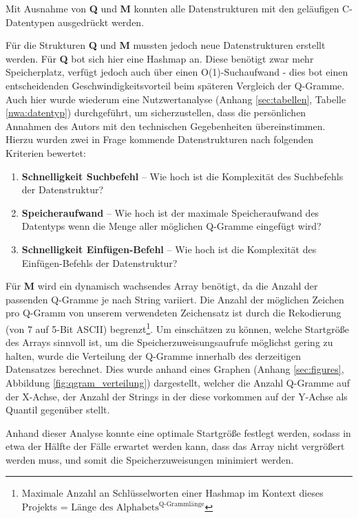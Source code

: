 Mit Ausnahme von \textbf{Q} und \textbf{M} konnten  alle Datenstrukturen mit den geläufigen C-Datentypen ausgedrückt werden.

Für die Strukturen \textbf{Q} und \textbf{M} mussten jedoch neue Datenstrukturen
erstellt werden. Für \textbf{Q} bot sich hier eine Hashmap an. Diese benötigt zwar
mehr Speicherplatz, verfügt jedoch auch über einen O(1)-Suchaufwand - dies bot einen entscheidenden Geschwindigkeitsvorteil beim späteren Vergleich der Q-Gramme.
Auch hier wurde wiederum eine Nutzwertanalyse (Anhang \ref{sec:tabellen}, Tabelle \ref{nwa:datentyp}) durchgeführt,
um sicherzustellen, dass die persönlichen Annahmen des Autors mit den technischen
Gegebenheiten übereinstimmen.
Hierzu wurden zwei in Frage kommende Datenstrukturen nach folgenden Kriterien bewertet:

\begin{enumerate}
	\item \textbf{Schnelligkeit Suchbefehl} -- Wie hoch ist die Komplexität des Suchbefehls der Datenstruktur?
    \item \textbf{Speicheraufwand} -- Wie hoch ist der maximale Speicheraufwand des Datentyps wenn die Menge aller möglichen Q-Gramme eingefügt wird?
    \item \textbf{Schnelligkeit Einfügen-Befehl} -- Wie hoch ist die Komplexität des Einfügen-Befehls der Datenstruktur?\\

\end{enumerate}

Für \textbf{M} wird ein dynamisch wachsendes Array benötigt, da die Anzahl der passenden
Q-Gramme je nach String variiert. Die Anzahl der möglichen Zeichen pro Q-Gramm
von unserem verwendeten Zeichensatz ist durch die Rekodierung (von 7 auf 5-Bit ASCII)
begrenzt\footnote{Maximale Anzahl an Schlüsselworten einer Hashmap im Kontext dieses Projekts = $\text{Länge des Alphabets}^\text{Q-Grammlänge}$ }.
Um einschätzen zu können, welche Startgröße des Arrays sinnvoll ist, um die
Speicherzuweisungsaufrufe möglichst gering zu halten, wurde die Verteilung der
Q-Gramme innerhalb des derzeitigen Datensatzes berechnet. Dies wurde anhand eines
Graphen (Anhang \ref{sec:figures}, Abbildung \ref{fig:qgram_verteilung}) dargestellt, welcher die Anzahl
Q-Gramme auf der X-Achse, der Anzahl der Strings in der diese vorkommen auf der Y-Achse als Quantil gegenüber stellt.

Anhand dieser Analyse konnte eine optimale Startgröße festlegt werden, sodass in etwa der Hälfte der Fälle
erwartet werden kann, dass das Array nicht vergrößert werden muss, und somit die
Speicherzuweisungen minimiert werden.


